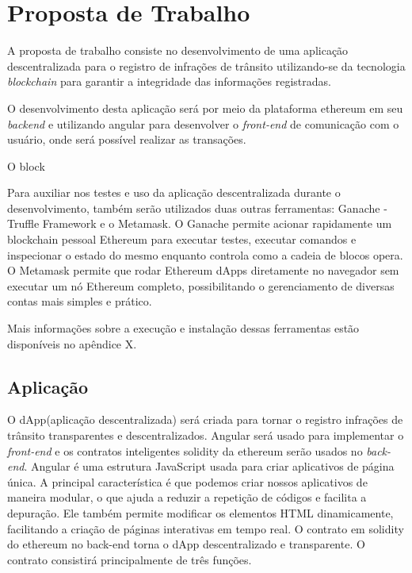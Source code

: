 \chapter[Proposta de Trabalho]{Proposta de Trabalho}


A proposta de trabalho consiste no desenvolvimento de uma aplicação descentralizada para o registro de infrações de trânsito utilizando-se da tecnologia \textit{blockchain} para garantir a integridade das informações registradas. 

O desenvolvimento desta aplicação será por meio da plataforma ethereum em seu \textit{backend} e utilizando angular para desenvolver o \textit{front-end} de comunicação com o usuário, onde será possível realizar as transações.

O block

Para auxiliar nos testes e uso da aplicação descentralizada durante o desenvolvimento, também serão utilizados duas outras ferramentas: Ganache - Truffle Framework e o Metamask. O Ganache permite acionar rapidamente um blockchain pessoal Ethereum para executar testes, executar comandos e inspecionar o estado do mesmo enquanto controla como a cadeia de blocos opera. O Metamask permite que rodar Ethereum dApps diretamente no navegador sem executar um nó Ethereum completo, possibilitando o gerenciamento de diversas contas mais simples e prático.

Mais informações sobre a execução e instalação dessas ferramentas estão disponíveis no apêndice X.


\section{Aplicação}

O dApp(aplicação descentralizada) será criada para tornar o registro infrações de trânsito transparentes e descentralizados. Angular será usado para implementar o \textit{front-end} e os contratos inteligentes solidity da ethereum serão usados no \textit{back-end}. Angular é uma estrutura JavaScript usada para criar aplicativos de página única. A principal característica é que podemos criar nossos aplicativos de maneira modular, o que ajuda a reduzir a repetição de códigos e facilita a depuração. Ele também permite modificar os elementos HTML dinamicamente, facilitando a criação de páginas interativas em tempo real. O contrato em solidity do  ethereum no back-end torna o dApp descentralizado e transparente. O contrato consistirá principalmente de três funções.

